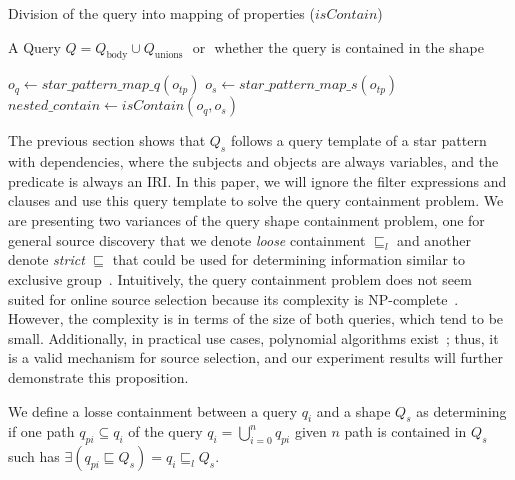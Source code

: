 \begin{algorithm}
   \caption{Division of the query into mapping of properties ($isContain$)}\label{alg:divideQuery}
   \begin{algorithmic}
      \REQUIRE A Query $Q = Q_{\text{body}} \cup Q_{\text{unions}}$
      \ENSURE \TRUE $ $ or \FALSE $ $ whether the query is contained in the shape

            \STATE $o_q \leftarrow star\_pattern\_map\_q(o_{tp})$
            \STATE $o_s \leftarrow star\_pattern\_map\_s(o_{tp})$
               \STATE $ nested\_contain \leftarrow isContain(o_q, o_s)$
                  \RETURN \FALSE
               \ENDIF 
            \ENDIF
         \ELSE
            \RETURN \FALSE
         \ENDIF
      \ENDFOR
      \RETURN \TRUE
   \end{algorithmic}
\end{algorithm}

\iffalse
The previous section shows that $Q_s$ follows a query template of a star pattern with dependencies, where the subjects and objects are always variables, and the predicate is always an IRI.
In this paper, we will ignore the filter expressions and clauses and use this query template to solve the query containment problem.
We are presenting two variances of the query shape containment problem, one for general source discovery that we denote \emph{loose} containment $\sqsubseteq_l$ and 
another denote \emph{strict} $\sqsubseteq$ that could be used for determining information similar to exclusive group~\cite{Schwarte2011}. 
Intuitively, the query containment problem does not seem suited for online source selection because its complexity is NP-complete~\cite{Spasi2023}.
However, the complexity is in terms of the size of both queries, which tend to be small.
Additionally, in practical use cases, polynomial algorithms exist~\cite{Doan2012}; 
thus, it is a valid mechanism for source selection, and our experiment results will further demonstrate this proposition.





\begin{definition}\label{def:looseContainment}
We define a losse containment between a query $q_i$ and a shape $Q_s$ as determining if one path $q_{pi} \subseteq q_i$ of the query $q_i = \bigcup_{i=0}^{n} q_{pi}$ given $n$ path is contained in 
$Q_s$ such has $\exists (q_{pi} \sqsubseteq  Q_s) = q_{i} \sqsubseteq_l  Q_s$.
\end{definition}

